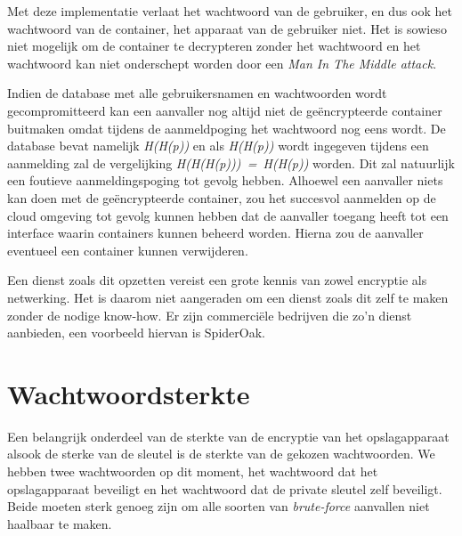 Met deze implementatie verlaat het wachtwoord van de gebruiker, en dus ook het
wachtwoord van de container, het apparaat van de gebruiker niet. Het is sowieso
niet mogelijk om de container te decrypteren zonder het wachtwoord en het
wachtwoord kan niet onderschept worden door een \textit{Man In The Middle
	attack}.

Indien de database met alle gebruikersnamen en wachtwoorden wordt
gecompromitteerd kan een aanvaller nog altijd niet de geëncrypteerde container
buitmaken omdat tijdens de aanmeldpoging het wachtwoord nog eens
 wordt.
De database bevat namelijk \textit{H(H(p))} en als \textit{H(H(p))} wordt
ingegeven tijdens een aanmelding zal de vergelijking
\textit{H(H(H(p)))~=~H(H(p))} worden. Dit zal natuurlijk een foutieve
aanmeldingspoging tot gevolg
hebben. Alhoewel een aanvaller niets kan doen met de geëncrypteerde container,
zou het succesvol aanmelden op de cloud omgeving tot gevolg kunnen hebben dat de
aanvaller toegang heeft tot een interface waarin containers kunnen beheerd
worden. Hierna zou de aanvaller eventueel een container kunnen verwijderen.

Een dienst zoals dit opzetten vereist een grote kennis van zowel encryptie als
netwerking. Het is daarom niet aangeraden om een dienst zoals dit zelf te maken
zonder de nodige know-how. Er zijn commerciële bedrijven die zo’n dienst
aanbieden, een voorbeeld hiervan is SpiderOak.

\section{Wachtwoordsterkte}
\label{sec:wachtwoordsterkte}

Een belangrijk onderdeel van de sterkte van de encryptie van het opslagapparaat
alsook de sterke van de sleutel is de sterkte van de gekozen wachtwoorden. We
hebben twee wachtwoorden op dit moment, het wachtwoord dat het opslagapparaat
beveiligt en het wachtwoord dat de private sleutel zelf beveiligt. Beide moeten
sterk genoeg zijn om alle soorten van \textit{brute-force} aanvallen niet
haalbaar te maken.

